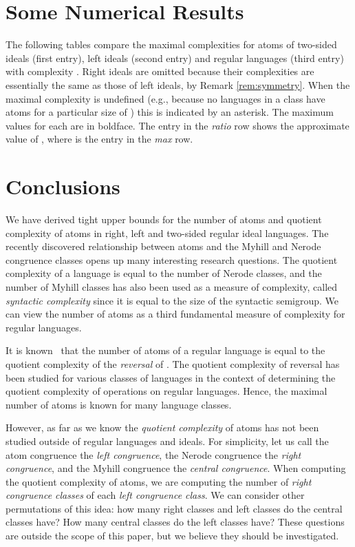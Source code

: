 \documentclass{llncs}
\begin{document}
\section{Some Numerical Results}
The following tables compare the maximal complexities for atoms  of two-sided ideals (first entry), left ideals (second entry) and regular languages (third entry) with complexity . Right ideals are omitted because their complexities are essentially the same as those of left ideals, by Remark \ref{rem:symmetry}.
When the maximal complexity is undefined (e.g., because no languages in a class have atoms  for a particular size of ) this is indicated by an asterisk. The maximum values for each  are in boldface. The  entry in the \emph{ratio} row shows the approximate value of , where  is the  entry in the \emph{max} row.



{\small

}

\section{Conclusions}
We have derived tight upper bounds for the number of atoms and quotient complexity of atoms in right, left and two-sided regular ideal languages.
The recently discovered relationship between atoms and the Myhill and Nerode congruence classes opens up many interesting research questions. 
The quotient complexity of a language is equal to the number of Nerode classes, and 
the number of Myhill classes has also been used as a measure of complexity, called \emph{syntactic complexity} since it is equal to the size of the syntactic semigroup. 
We can view the number of atoms as a third fundamental measure of complexity for regular languages.

It is known~\cite{BrTa13} that the number of atoms of a regular language  is equal to the quotient complexity of the \emph{reversal} of . The quotient complexity of reversal has been studied for various classes of languages in the context of determining the quotient complexity of operations on regular languages. Hence, the maximal number of atoms is known for many language classes.

However, as far as we know the \emph{quotient complexity} of atoms has not been studied outside of regular languages and ideals.
For simplicity, let us call the atom congruence the \emph{left congruence}, the Nerode congruence the \emph{right congruence}, and the Myhill congruence the \emph{central congruence}. 
When computing the quotient complexity of atoms, we are computing the number of \emph{right congruence classes} of each \emph{left congruence class}. 
We can consider other permutations of this idea: how many right classes and left classes do the central classes have? How many central classes do the left classes have? 
These questions are outside the scope of this paper, but we believe they should be investigated.
\end{document}
